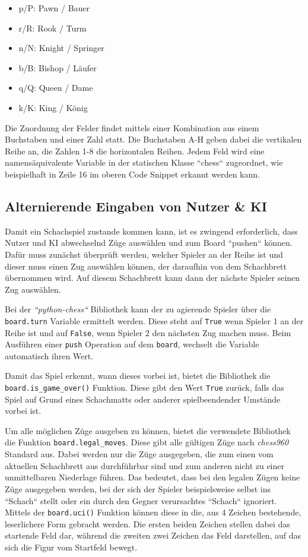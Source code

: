 \begin{itemize}
\tightlist
\item
  p/P: Pawn / Bauer
\item
  r/R: Rook / Turm
\item
  n/N: Knight / Springer
\item
  b/B: Bishop / Läufer
\item
  q/Q: Queen / Dame
\item
  k/K: King / König
\end{itemize}

    Die Zuordnung der Felder findet mittels einer Kombination aus einem
Buchstaben und einer Zahl statt. Die Buchstaben A-H geben dabei die
vertikalen Reihe an, die Zahlen 1-8 die horizontalen Reihen. Jedem Feld
wird eine namensäquivalente Variable in der statischen Klasse ``chess``
zugeordnet, wie beispielhaft in Zeile 16 im oberen Code Snippet erkannt
werden kann.

    \subsection{Alternierende Eingaben von Nutzer \&
KI}\label{alternierende-eingaben-von-nutzer-ki}

Damit ein Schachspiel zustande kommen kann, ist es zwingend
erforderlich, dass Nutzer und KI abwechselnd Züge auswählen und zum
Board ``pushen`` können. Dafür muss zunächst überprüft werden, welcher
Spieler an der Reihe ist und dieser muss einen Zug auswählen können, der
daraufhin von dem Schachbrett übernommen wird. Auf diesem Schachbrett
kann dann der nächste Spieler seinen Zug auswählen.

Bei der \emph{``python-chess``} Bibliothek kann der zu agierende Spieler
über die \texttt{board.turn} Variable ermittelt werden. Diese steht auf
\texttt{True} wenn Spieler 1 an der Reihe ist und auf \texttt{False},
wenn Spieler 2 den nächsten Zug machen muss. Beim Ausführen einer
\texttt{push} Operation auf dem \texttt{board}, wechselt die Variable
automatisch ihren Wert.

Damit das Spiel erkennt, wann dieses vorbei ist, bietet die Bibliothek
die \texttt{board.is\_game\_over()} Funktion. Diese gibt den Wert
\texttt{True} zurück, falls das Spiel auf Grund eines Schachmatts oder
anderer spielbeendender Umstände vorbei ist.

Um alle möglichen Züge ausgeben zu können, bietet die verwendete
Bibliothek die Funktion \texttt{board.legal\_moves}. Diese gibt alle
gültigen Züge nach \emph{chess960} Standard aus. Dabei werden nur die
Züge ausgegeben, die zum einen vom aktuellen Schachbrett aus
durchführbar sind und zum anderen nicht zu einer unmittelbaren
Niederlage führen. Das bedeutet, dass bei den legalen Zügen keine Züge
ausgegeben werden, bei der sich der Spieler beispielsweise selbst ins
``Schach`` stellt oder ein durch den Gegner verursachtes ``Schach``
ignoriert. Mittels der \texttt{board.uci()} Funktion können diese in
die, aus 4 Zeichen bestehende, leserlichere Form gebracht werden. Die
ersten beiden Zeichen stellen dabei das startende Feld dar, während die
zweiten zwei Zeichen das Feld darstellen, auf das sich die Figur vom
Startfeld bewegt.

